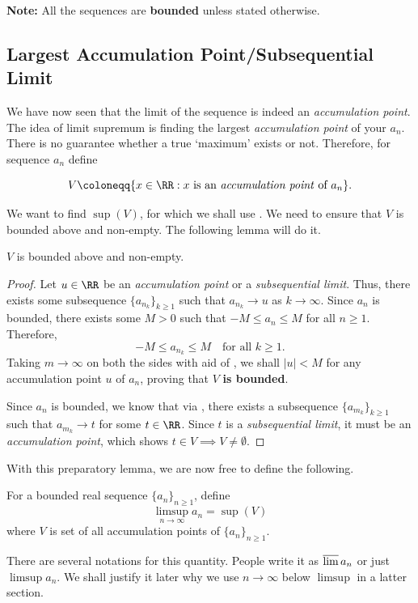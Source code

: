 \documentclass[parskip=half, numbers=endperiod, 11pt]{scrartcl}
\begin{document}
\begin{center}
	{\color{red}\textbf{Note:}} All the sequences
	are \textbf{bounded} unless stated otherwise.
\end{center}

\subsection{Largest Accumulation Point/Subsequential Limit}
We have now seen that the limit of the sequence is indeed
an \emph{accumulation point}. The idea of limit supremum
is finding the largest \emph{accumulation point} of
your $a_n$. There is no guarantee whether a true
`maximum' exists or not. Therefore, for sequence
$a_{n}$ define

\[V \coloneqq \{x \in \RR : x\text{ is an \emph{accumulation point} of } a_n\}. \]

We want to find $\sup(V)$, for which we shall use
. We need to ensure that
$V$ is bounded above and non-empty. The following
lemma will do it.

\begin{lemma}\label{lem:subseq_lim_bounded-non-empty}
	$V$ is bounded above and non-empty.
\end{lemma}
\begin{proof}
	Let $u \in \RR$ be an \emph{accumulation point} or a
	\emph{subsequential limit}. Thus, there exists some
	subsequence $\{a_{n_k}\}_{k \ge 1}$ such that
	$a_{n_k} \to u$ as $k \to \infty$. Since $a_n$ is
	bounded, there exists some $M > 0$ such that
	$-M \le a_n \le M$ for all $n \ge 1$. Therefore,
	\[-M \le a_{n_k} \le M \quad \text{for all $k \ge 1$.}\]
	Taking $m \to \infty$ on both the sides with aid of
	, we shall $|u| < M$ for any
	accumulation point $u$ of $a_n$, proving that
	$V$ \textbf{is bounded}.

	Since $a_n$ is bounded, we know that via
	, there exists a
	subsequence $\{a_{m_k}\}_{k \ge 1}$ such that
	$a_{m_k} \to t$
	for some $t \in \RR$. Since $t$ is a \emph{subsequential
		limit}, it must be an \emph{accumulation point}, which
	shows $t \in V \implies V \ne \emptyset$.
\end{proof}

With this preparatory lemma, we are now free to define
the following.
\begin{definition}
	For a bounded real sequence $\{a_n\}_{n \ge 1}$,
	define
	\[\limsup_{n \to \infty} a_n = \sup(V)\]
	where $V$ is set of all accumulation points of
	$\{a_n\}_{n \ge 1}$.
\end{definition}
\begin{remark*}[Notation]
	There are several notations for this quantity. People
	write it as $\varlimsup a_n$ or just $\limsup a_n$.
	We shall justify it later why we use $n \to \infty$
	below $\limsup$ in a latter section.
\end{remark*}
\end{document}
